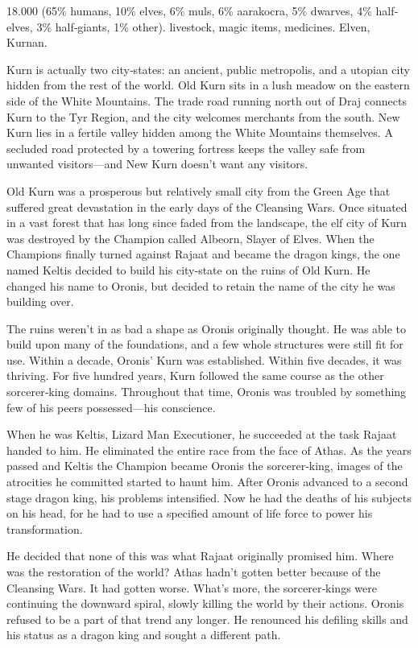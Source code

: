 {18.000 (65\% humans, 10\% elves, 6\% muls, 6\% aarakocra, 5\% dwarves, 4\% half‐elves, 3\% half‐giants, 1\% other).}
{livestock, magic items, medicines.}
{Elven, Kurnan.}
{
	Kurn is actually two city‐states: an ancient, public metropolis, and a utopian city hidden from the rest of the world. Old Kurn sits in a lush meadow on the eastern side of the White Mountains. The trade road running north out of Draj connects Kurn to the Tyr Region, and the city welcomes merchants from the south. New Kurn lies in a fertile valley hidden among the White Mountains themselves. A secluded road protected by a towering fortress keeps the valley safe from unwanted visitors---and New Kurn doesn’t want any visitors.

	Old Kurn was a prosperous but relatively small city from the Green Age that suffered great devastation in the early days of the Cleansing Wars. Once situated in a vast forest that has long since faded from the landscape, the elf city of Kurn was destroyed by the Champion called Albeorn, Slayer of Elves. When the Champions finally turned against Rajaat and became the dragon kings, the one named Keltis decided to build his city‐state on the ruins of Old Kurn. He changed his name to Oronis, but decided to retain the name of the city he was building over.

	The ruins weren’t in as bad a shape as Oronis originally thought. He was able to build upon many of the foundations, and a few whole structures were still fit for use. Within a decade, Oronis’ Kurn was established. Within five decades, it was thriving. For five hundred years, Kurn followed the same course as the other sorcerer‐king domains. Throughout that time, Oronis was troubled by something few of his peers possessed---his conscience.

	When he was Keltis, Lizard Man Executioner, he succeeded at the task Rajaat handed to him. He eliminated the entire race from the face of Athas. As the years passed and Keltis the Champion became Oronis the sorcerer‐king, images of the atrocities he committed started to haunt him. After Oronis advanced to a second stage dragon king, his problems intensified. Now he had the deaths of his subjects on his head, for he had to use a specified amount of life force to power his transformation.

	He decided that none of this was what Rajaat originally promised him. Where was the restoration of the world? Athas hadn’t gotten better because of the Cleansing Wars. It had gotten worse. What’s more, the sorcerer‐kings were continuing the downward spiral, slowly killing the world by their actions. Oronis refused to be a part of that trend any longer. He renounced his defiling skills and his status as a dragon king and sought a different path.

}
